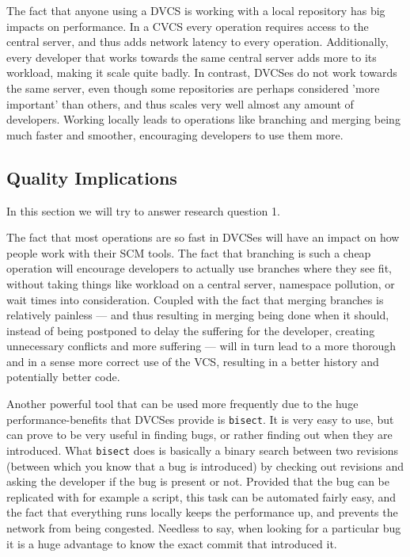 \documentclass{llncs}
\begin{document}
The fact that anyone using a DVCS is working with a local repository
has big impacts on performance. In a CVCS every operation requires
access to the central server, and thus adds network latency to every
operation\cite{torvalds07}. Additionally, every developer that works
towards the same central server adds more to its workload, making it
scale quite badly\cite{mackall06}. In contrast, DVCSes do not work
towards the same server, even though some repositories are perhaps
considered 'more important' than others, and thus scales very well
almost any amount of developers\cite{shaikh02}. Working locally leads
to operations like branching and merging being much faster and
smoother, encouraging developers to use them more\cite{alwis09}.

\subsection{Quality Implications}
In this section we will try to answer research question 1.

The fact that most operations are so fast in DVCSes will have an
impact on how people work with their SCM tools. The fact that
branching is such a cheap operation will encourage developers to
actually use branches where they see fit\cite{alwis09}, without taking
things like workload on a central server, namespace pollution, or wait
times into consideration. Coupled with the fact that merging branches
is relatively painless\cite{alwis09}\cite{osullivan09} --- and thus
resulting in merging being done when it should, instead of being
postponed to delay the suffering for the developer, creating
unnecessary conflicts and more suffering\cite{osullivan09} --- will in
turn lead to a more thorough and in a sense more correct use of the
VCS, resulting in a better history and potentially better code.

Another powerful tool that can be used more frequently due to the huge
performance-benefits that DVCSes provide is \verb!bisect!. It is very
easy to use, but can prove to be very useful in finding bugs, or
rather finding out when they are introduced\cite{osullivan09}. What
\verb!bisect! does is basically a binary search between two revisions
(between which you know that a bug is introduced) by checking out
revisions and asking the developer if the bug is present or
not. Provided that the bug can be replicated with for example a
script, this task can be automated fairly easy, and the fact that
everything runs locally keeps the performance up, and prevents the
network from being congested.  Needless to say, when looking for a
particular bug it is a huge advantage to know the exact commit that
introduced it.
\end{document}
